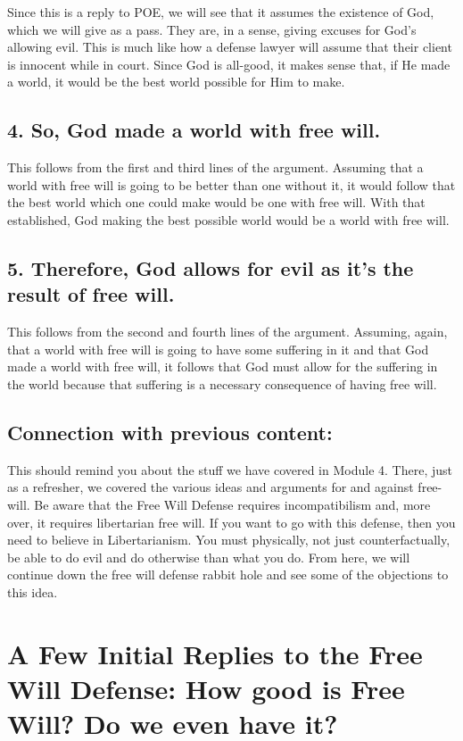Since this is a reply to POE, we will see that it assumes the existence of God, which we will give as a pass. They are, in a sense, giving excuses for God's allowing evil. This is much like how a defense lawyer will assume that their client is innocent while in court. Since God is all-good, it makes sense that, if He made a world, it would be the best world possible for Him to make. 

\subsection{4. So, God made a world with free will.}

This follows from the first and third lines of the argument. Assuming that a world with free will is going to be better than one without it, it would follow that the best world which one could make would be one with free will. With that established, God making the best possible world would be a world with free will.

\subsection{5. Therefore, God allows for evil as it's the result of free will.}

This follows from the second and fourth lines of the argument. Assuming, again, that a world with free will is going to have some suffering in it and that God made a world with free will, it follows that God must allow for the suffering in the world because that suffering is a necessary consequence of having free will. 

\subsection{Connection with previous content:}

This should remind you about the stuff we have covered in Module 4. There, just as a refresher, we covered the various ideas and arguments for and against free-will. Be aware that the Free Will Defense requires incompatibilism and, more over, it requires libertarian free will. If you want to go with this defense, then you need to believe in Libertarianism. You must physically, not just counterfactually, be able to do evil and do otherwise than what you do.  From here, we will continue down the free will defense rabbit hole and see some of the objections to this idea.
\section{A Few Initial Replies to the Free Will Defense: How good is Free Will? Do we even have it?}

